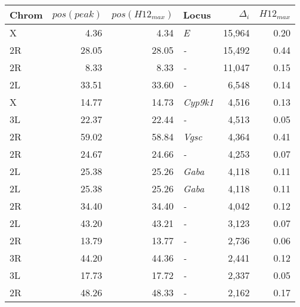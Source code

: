\begin{tabular}{lrrlrr}
\toprule
Chrom & $pos(peak)$ & $pos(H12_{max})$ &            Locus & $\Delta_{i}$ & $H12_{max}$ \\
\midrule
    X &        4.36 &             4.34 &       \textit{E} &       15,964 &        0.20 \\
   2R &       28.05 &            28.05 &       \textit{-} &       15,492 &        0.44 \\
   2R &        8.33 &             8.33 &       \textit{-} &       11,047 &        0.15 \\
   2L &       33.51 &            33.60 &       \textit{-} &        6,548 &        0.14 \\
    X &       14.77 &            14.73 &  \textit{Cyp9k1} &        4,516 &        0.13 \\
   3L &       22.37 &            22.44 &       \textit{-} &        4,513 &        0.05 \\
   2R &       59.02 &            58.84 &    \textit{Vgsc} &        4,364 &        0.41 \\
   2R &       24.67 &            24.66 &       \textit{-} &        4,253 &        0.07 \\
   2L &       25.38 &            25.26 &    \textit{Gaba} &        4,118 &        0.11 \\
   2L &       25.38 &            25.26 &    \textit{Gaba} &        4,118 &        0.11 \\
   2R &       34.40 &            34.40 &       \textit{-} &        4,042 &        0.12 \\
   2L &       43.20 &            43.21 &       \textit{-} &        3,123 &        0.07 \\
   2R &       13.79 &            13.77 &       \textit{-} &        2,736 &        0.06 \\
   3R &       44.20 &            44.36 &       \textit{-} &        2,441 &        0.12 \\
   3L &       17.73 &            17.72 &       \textit{-} &        2,337 &        0.05 \\
   2R &       48.26 &            48.33 &       \textit{-} &        2,162 &        0.17 \\
\bottomrule
\end{tabular}
